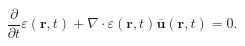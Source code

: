 \begin{equation}
\frac{\partial}{\partial t}\varepsilon (\mathbf{r},t)  +
\nabla \cdot \varepsilon (\mathbf{r},t) \overline{
\mathbf{u}}(\mathbf{r},t)  = 0.
 \label{eq:continuityincompressible}
\end{equation}
